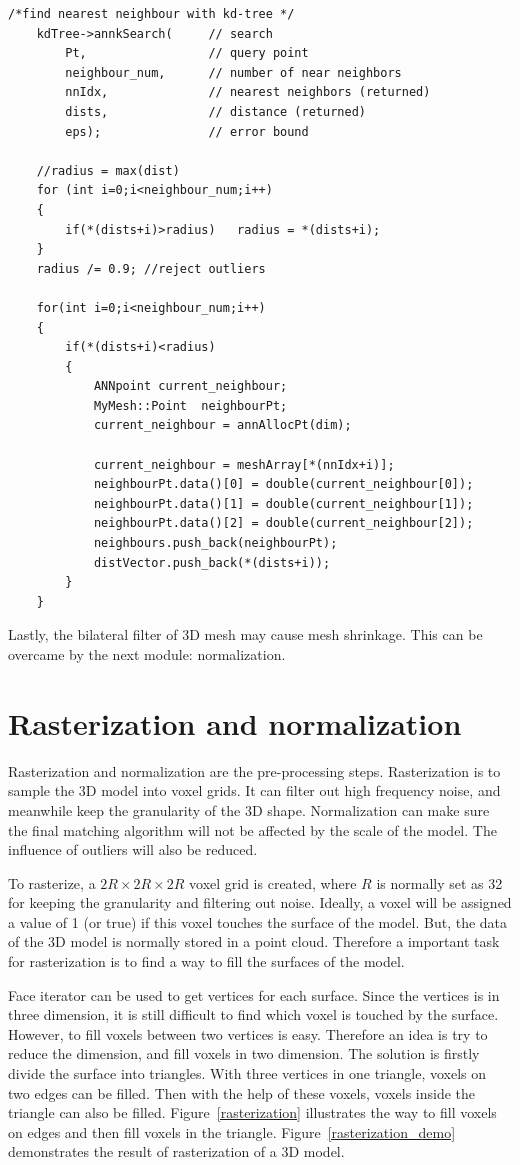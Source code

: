 \begin{lstlisting}[xleftmargin=1em]
/*find nearest neighbour with kd-tree */
	kdTree->annkSearch(		// search
		Pt,					// query point
		neighbour_num,      // number of near neighbors
		nnIdx,				// nearest neighbors (returned)
		dists,				// distance (returned)
		eps);				// error bound

	//radius = max(dist)
	for (int i=0;i<neighbour_num;i++)
	{
		if(*(dists+i)>radius)	radius = *(dists+i); 
	}
	radius /= 0.9; //reject outliers

	for(int i=0;i<neighbour_num;i++)
	{
		if(*(dists+i)<radius)
		{
			ANNpoint current_neighbour;
			MyMesh::Point  neighbourPt;
			current_neighbour = annAllocPt(dim);

			current_neighbour = meshArray[*(nnIdx+i)];
			neighbourPt.data()[0] = double(current_neighbour[0]);
			neighbourPt.data()[1] = double(current_neighbour[1]);
			neighbourPt.data()[2] = double(current_neighbour[2]);
			neighbours.push_back(neighbourPt);
			distVector.push_back(*(dists+i));
		}
	}
\end{lstlisting}

Lastly, the bilateral filter of 3D mesh may cause mesh shrinkage. This can be overcame by the next module: normalization. 

\section{Rasterization and normalization}

Rasterization and normalization are the pre-processing steps. Rasterization is to sample the 3D model into voxel grids. It can filter out high frequency noise, and meanwhile keep the granularity of the 3D shape. Normalization can make sure the final matching algorithm will not be affected by the scale of the model. The influence of outliers will also be reduced. 

To rasterize, a $2R\times2R\times2R$ voxel grid is created, where $R$ is normally set as 32 for keeping the granularity and filtering out noise. Ideally, a voxel will be assigned a value of 1 (or true) if this voxel touches the surface of the model. But, the data of the 3D model is normally stored in a point cloud. Therefore a important task for rasterization is to find a way to fill the surfaces of the model. 

Face iterator can be used to get vertices for each surface. Since the vertices is in three dimension, it is still difficult to find which voxel is touched by the surface. However, to fill voxels between two vertices is easy. Therefore an idea is try to reduce the dimension, and fill voxels in two dimension. The solution is firstly divide the surface into triangles. With three vertices in one triangle, voxels on two edges can be filled. Then with the help of these voxels, voxels inside the triangle can also be filled. Figure~\ref{rasterization} illustrates the way to fill voxels on edges and then fill voxels in the triangle. Figure~\ref{rasterization_demo} demonstrates the result of rasterization of a 3D model.

